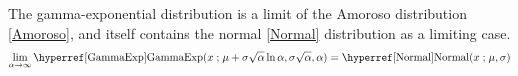 The gamma-exponential distribution is a limit of the Amoroso distribution \eqref{Amoroso}, and itself contains the normal \eqref{Normal} distribution as a limiting case.
\[
\lim_{\alpha\rightarrow\infty} \opr{GammaExp}(x\given  \mu+\sigma\sqrt{\alpha}\ln\alpha, \sigma\sqrt{\alpha},\alpha)
= \opr{Normal}(x\given \mu, \sigma)
\checked
\notag
\]


